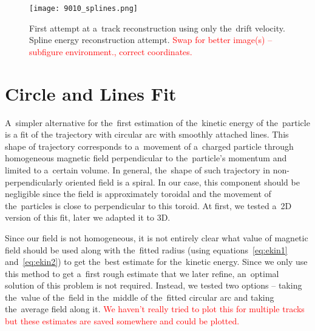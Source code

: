 		\begin{figure}
			\centering
			\texttt{[image: 9010\_splines.png]}
			\caption{First attempt at a~track reconstruction using only the~drift velocity. Spline energy reconstruction attempt. \textcolor{red}{Swap for better image(s) -- subfigure environment., correct coordinates.}}
			\label{fig:9010splines}
		\end{figure}
	
	\section{Circle and Lines Fit}
	\label{sec:clines}
		A~simpler alternative for the~first estimation of the~kinetic energy of the~particle is a fit of the trajectory with circular arc with smoothly attached lines. This shape of trajectory corresponds to a~movement of a~charged particle through homogeneous magnetic field perpendicular to the~particle's momentum and limited to a~certain volume. In general, the~shape of such trajectory in non-perpendicularly oriented field is a spiral. In our case, this component should be negligible since the field is approximately toroidal and the movement of the~particles is close to perpendicular to this toroid. At first, we tested a~2D version of this fit, later we adapted it to 3D.
		
		Since our field is not homogeneous, it is not entirely clear what value of magnetic field should be used along with the~fitted radius (using equations~\ref{eq:ekin1} and~\ref{eq:ekin2}) to get the~best estimate for the~kinetic energy. Since we only use this method to get a~first rough estimate that we later refine, an~optimal solution of this problem is not required. Instead, we tested two options -- taking the~value of the~field in the~middle of the~fitted circular arc and taking the~average field along it. \textcolor{red}{We haven't really tried to plot this for multiple tracks but these estimates are saved somewhere and could be plotted.}
		
